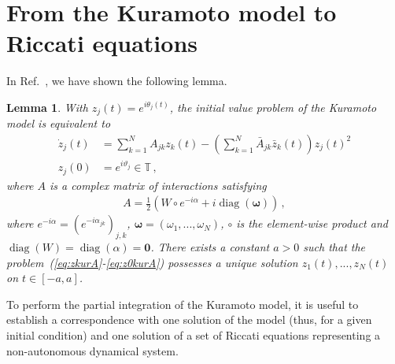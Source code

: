 \documentclass[aps,pre,reprint,longbibliography,superscriptaddress,noshowpacs,floatfix]{revtex4-2}
\newtheorem{lemma}{Lemma}
\theoremstyle{definition}
\theoremstyle{remark}
\DeclareMathOperator{\diag}{diag}
\DeclareMathOperator{\Imag}{Im}
\begin{document}
\tableofcontents



\section{From the Kuramoto model to Riccati equations}
\label{subsec:descriptions}

In Ref.~\cite{Thibeault2026}, we have shown the following lemma.
\begin{lemma}\label{lem:correspondance_complexe_A}
    With $z_j(t) = e^{i\theta_j(t)}$, the initial value problem of the Kuramoto model is equivalent to 
\begin{align}
    \dot{z}_j(t) &= \sum_{k=1}^NA_{jk}z_k(t) - \left(\sum_{k=1}^N\bar{A}_{jk}\bar{z}_k(t) \right)z_j(t)^2 \label{eq:zkurA}\\
    z_j(0) &= e^{i\vartheta_j}  \in \mathbb{T}\label{eq:z0kurA}\,,
\end{align}
where $A$ is a complex matrix of interactions satisfying
\begin{align}
    A = \frac{1}{2}\left(W \circ e^{-i\alpha} + i\diag(\bm{\omega})\right)\,,
\end{align}
where $e^{-i\alpha} = (e^{-i\alpha_{jk}})_{j,k}$, $\bm{\omega} = (\omega_1,...,\omega_N)$, $\circ$ is the element-wise product and $\diag(W) = \diag(\alpha) = \bm{0}$. There exists a constant $a > 0$ such that the problem~(\ref{eq:zkurA}-\ref{eq:z0kurA}) possesses a unique solution $z_1(t),..., z_N(t)$ on $t\in[-a, a]$.
\end{lemma}
To perform the partial integration of the Kuramoto model, it is useful to establish a correspondence with one solution of the model (thus, for a given initial condition) and one solution of a set of Riccati equations representing a non-autonomous dynamical system.
\end{document}
